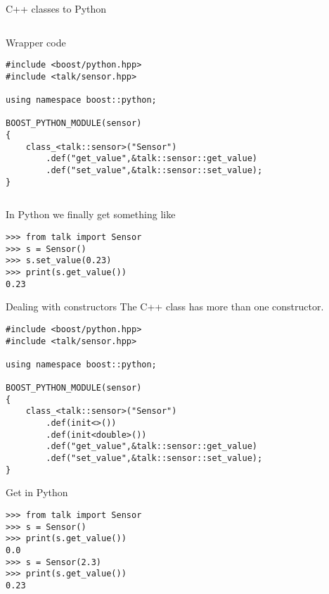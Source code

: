\begin{frame}[fragile]{C++ classes to Python}
    \begin{columns}[t]
        \hfill
        \begin{column}{0.5\linewidth}
            Wrapper code
            \begin{verbatim}
#include <boost/python.hpp>
#include <talk/sensor.hpp>

using namespace boost::python;

BOOST_PYTHON_MODULE(sensor)
{
    class_<talk::sensor>("Sensor")
        .def("get_value",&talk::sensor::get_value)
        .def("set_value",&talk::sensor::set_value);
}
            \end{verbatim}
        \end{column}
    \end{columns}
    \vspace{0.03\textheight}
    In Python we finally get something like
    \begin{verbatim}
>>> from talk import Sensor
>>> s = Sensor()
>>> s.set_value(0.23)
>>> print(s.get_value())
0.23
    \end{verbatim}
\end{frame}

\begin{frame}[fragile]{Dealing with constructors}
    The C++ class has more than one constructor.
    \vspace{0.02\textheight}
    \begin{verbatim}
#include <boost/python.hpp>
#include <talk/sensor.hpp>

using namespace boost::python;

BOOST_PYTHON_MODULE(sensor)
{
    class_<talk::sensor>("Sensor")
        .def(init<>())
        .def(init<double>())
        .def("get_value",&talk::sensor::get_value)
        .def("set_value",&talk::sensor::set_value);
}
    \end{verbatim}
    \vspace{0.03\textheight}
    Get in Python
    \vspace{0.02\textheight}
    \begin{verbatim}
>>> from talk import Sensor
>>> s = Sensor()
>>> print(s.get_value())
0.0
>>> s = Sensor(2.3)
>>> print(s.get_value())
0.23
    \end{verbatim}
\end{frame}

